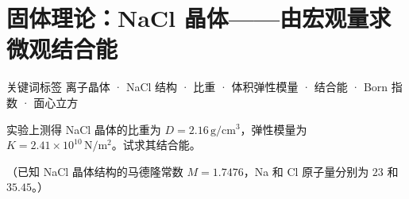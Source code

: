 \section{固体理论：NaCl 晶体——由宏观量求微观结合能}
\label{sec:nacl-binding-energy}

\begin{tipbox}{关键词标签}
离子晶体 · NaCl 结构 · 比重 · 体积弹性模量 · 结合能 · Born 指数 · 面心立方
\end{tipbox}

\begin{modelbox}
实验上测得 NaCl 晶体的比重为 $D = 2.16\,\mathrm{g/cm^3}$，弹性模量为 $K = 2.41\times 10^{10}\,\mathrm{N/m^2}$。试求其结合能。

（已知 NaCl 晶体结构的马德隆常数 $M = 1.7476$，Na 和 Cl 原子量分别为 $23$ 和 $35.45$。）
\end{modelbox}

